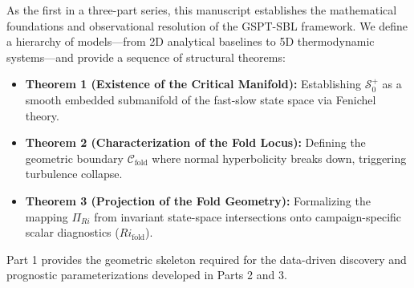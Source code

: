 As the first in a three-part series, this manuscript establishes the mathematical foundations and observational resolution of the GSPT-SBL framework. We define a hierarchy of models---from 2D analytical baselines to 5D thermodynamic systems---and provide a sequence of structural theorems:
\begin{itemize}
    \item \textbf{Theorem 1 (Existence of the Critical Manifold):} Establishing $\mathcal{S}_0^+$ as a smooth embedded submanifold of the fast-slow state space via Fenichel theory.
    \item \textbf{Theorem 2 (Characterization of the Fold Locus):} Defining the geometric boundary $\mathcal{C}_{\mathrm{fold}}$ where normal hyperbolicity breaks down, triggering turbulence collapse.
    \item \textbf{Theorem 3 (Projection of the Fold Geometry):} Formalizing the mapping $\Pi_{Ri}$ from invariant state-space intersections onto campaign-specific scalar diagnostics ($Ri_{\mathrm{fold}}$).
\end{itemize}

Part 1 provides the geometric skeleton required for the data-driven discovery and prognostic parameterizations developed in Parts 2 and 3.
